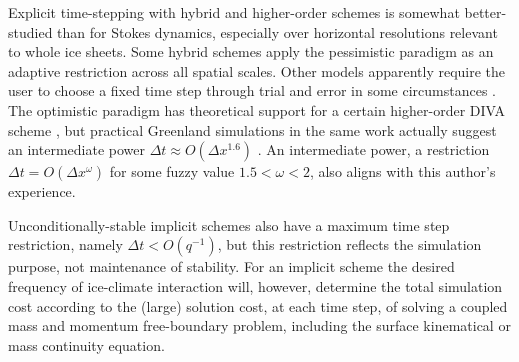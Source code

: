 \documentclass[review]{igs}
\begin{document}
Explicit time-stepping with hybrid and higher-order schemes is somewhat better-studied than for Stokes dynamics, especially over horizontal resolutions relevant to whole ice sheets.  Some hybrid schemes apply the pessimistic paradigm as an adaptive restriction \citep{Winkelmannetal2011} across all spatial scales.  Other models apparently require the user to choose a fixed time step through trial and error in some circumstances \citep[for example]{Fischleretal2022,Robinsonetal2022}.  The optimistic paradigm has theoretical support for a certain higher-order DIVA scheme \citep[Equation (52)]{Robinsonetal2022}, but practical Greenland simulations in the same work actually suggest an intermediate power $\Delta t \approx O(\Delta x^{1.6})$ \citep[Figure 3(a)]{Robinsonetal2022}.  An intermediate power, a restriction $\Delta t = O(\Delta x^\omega)$ for some fuzzy value $1.5<\omega<2$, also aligns with this author's experience.

Unconditionally-stable implicit schemes also have a maximum time step restriction, namely $\Delta t < O(q^{-1})$, but this restriction reflects the simulation purpose, not maintenance of stability.  For an implicit scheme the desired frequency of ice-climate interaction will, however, determine the total simulation cost according to the (large) solution cost, at each time step, of solving a coupled mass and momentum free-boundary problem, including the surface kinematical or mass continuity equation.

\end{document}
